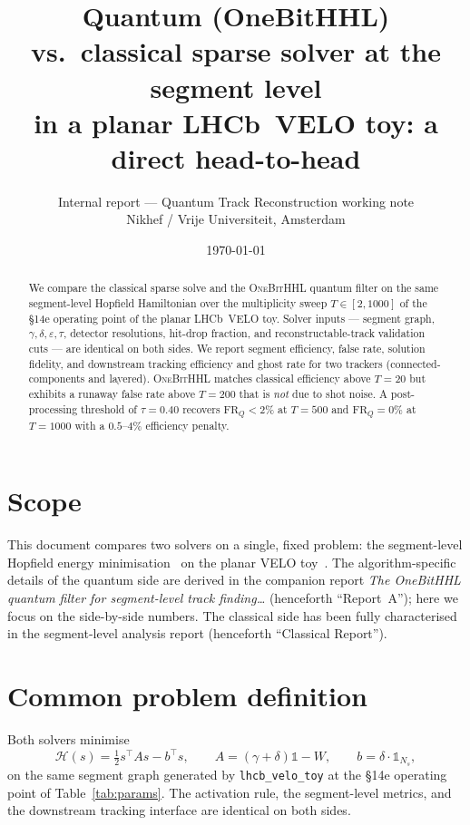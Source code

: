 \documentclass[11pt,a4paper]{article}
\title{Quantum (OneBitHHL) vs.\ classical sparse solver at the segment level\\
in a planar LHCb~VELO toy: a direct head-to-head}
\author{Internal report --- Quantum Track Reconstruction working note\\
\small Nikhef / Vrije Universiteit, Amsterdam}
\date{\today}
\newcommand{\FR}{\mathrm{FR}}
\begin{document}
\maketitle

\begin{abstract}
We compare the classical sparse solve and the \textsc{OneBitHHL} quantum filter on the
same segment-level Hopfield Hamiltonian over the multiplicity sweep $T \in [2, 1000]$ of
the §14e operating point of the planar LHCb~VELO toy. Solver inputs --- segment graph,
$\gamma, \delta, \varepsilon, \tau$, detector resolutions, hit-drop fraction, and
reconstructable-track validation cuts --- are identical on both sides. We report
segment efficiency, false rate, solution fidelity, and downstream tracking efficiency and
ghost rate for two trackers (connected-components and layered). \textsc{OneBitHHL} matches
classical efficiency above $T = 20$ but exhibits a runaway false rate above $T = 200$
that is \emph{not} due to shot noise. A post-processing threshold of $\tau = 0.40$
recovers $\FR_Q < 2\%$ at $T = 500$ and $\FR_Q = 0\%$ at $T = 1000$ with a $0.5\text{--}4\%$
efficiency penalty.
\end{abstract}

\section{Scope}
This document compares two solvers on a single, fixed problem: the segment-level Hopfield
energy minimisation~\cite{stimpfl_garrido} on the planar VELO toy~\cite{velo_toy}. The
algorithm-specific details of the quantum side are derived in the companion report
\emph{The OneBitHHL quantum filter for segment-level track finding\ldots} (henceforth
``Report~A''); here we focus on the side-by-side numbers. The classical side has been
fully characterised in the segment-level analysis report (henceforth ``Classical
Report'').

\section{Common problem definition}
\label{sec:common}
Both solvers minimise
\begin{equation}
\mathcal H(s) = \tfrac{1}{2} s^{\top} A s - b^{\top} s, \qquad
A = (\gamma + \delta) \mathbb 1 - W, \qquad b = \delta \cdot \mathbb 1_{N_s},
\end{equation}
on the same segment graph generated by \texttt{lhcb\_velo\_toy} at the §14e operating
point of Table~\ref{tab:params}. The activation rule, the segment-level metrics, and the
downstream tracking interface are identical on both sides.
\end{document}
